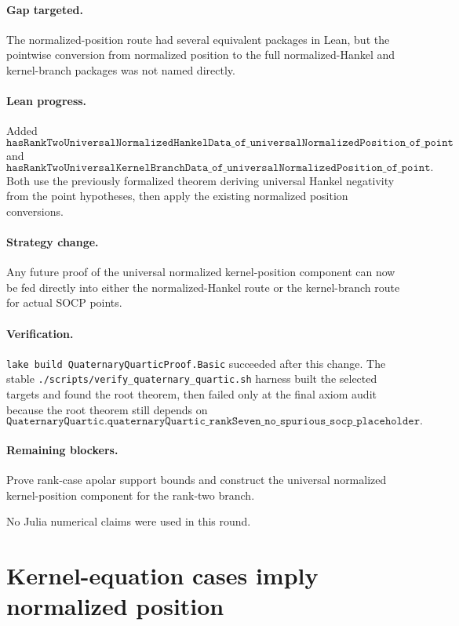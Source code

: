 \documentclass[11pt]{article}
\begin{document}
\paragraph{Gap targeted.}
The normalized-position route had several equivalent packages in Lean, but the
pointwise conversion from normalized position to the full normalized-Hankel and
kernel-branch packages was not named directly.

\paragraph{Lean progress.}
Added
\[
\texttt{hasRankTwoUniversalNormalizedHankelData\_of\_universalNormalizedPosition\_of\_point}
\]
and
\[
\texttt{hasRankTwoUniversalKernelBranchData\_of\_universalNormalizedPosition\_of\_point}.
\]
Both use the previously formalized theorem deriving universal Hankel
negativity from the point hypotheses, then apply the existing normalized
position conversions.

\paragraph{Strategy change.}
Any future proof of the universal normalized kernel-position component can now
be fed directly into either the normalized-Hankel route or the kernel-branch
route for actual SOCP points.

\paragraph{Verification.}
\texttt{lake build QuaternaryQuarticProof.Basic} succeeded after this change.
The stable \texttt{./scripts/verify\_quaternary\_quartic.sh} harness built the
selected targets and found the root theorem, then failed only at the final axiom
audit because the root theorem still depends on
\[
\texttt{QuaternaryQuartic.quaternaryQuartic\_rankSeven\_no\_spurious\_socp\_placeholder}.
\]

\paragraph{Remaining blockers.}
Prove rank-case apolar support bounds and construct the universal normalized
kernel-position component for the rank-two branch.

No Julia numerical claims were used in this round.

\section*{Kernel-equation cases imply normalized position}
\end{document}
